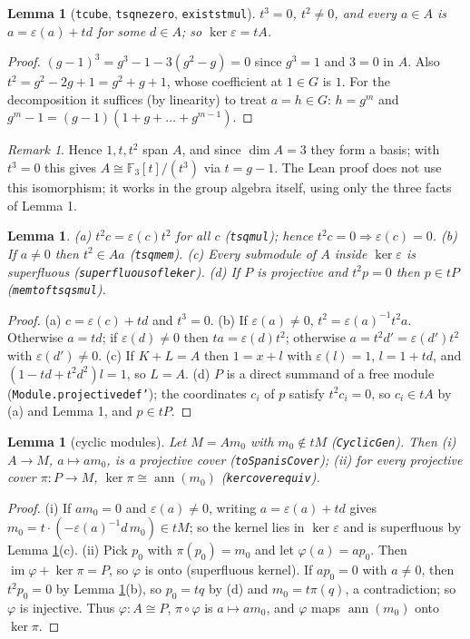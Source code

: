 \documentclass[11pt]{article}
\renewcommand{\_}{\oldus\allowbreak}
\newtheorem{lemma}[theorem]{Lemma}
\theoremstyle{definition}
\theoremstyle{remark}
\newtheorem{remark}[theorem]{Remark}
\begin{document}
\begin{lemma}[\texttt{t\_cube}, \texttt{t\_sq\_ne\_zero}, \texttt{exists\_t\_mul}]
$t^3=0$, $t^2\ne0$, and every $a\in A$ is $a=\varepsilon(a)+td$ for some $d\in A$; so
$\ker\varepsilon=tA$.
\end{lemma}
\begin{proof}
$(g-1)^3=g^3-1-3(g^2-g)=0$ since $g^3=1$ and $3=0$ in $A$. Also $t^2=g^2-2g+1=g^2+g+1$, whose
coefficient at $1\in G$ is $1$. For the decomposition it suffices (by linearity) to treat $a=h\in G$:
$h=g^m$ and $g^m-1=(g-1)(1+g+\dots+g^{m-1})$.
\end{proof}

\begin{remark}
Hence $1,t,t^2$ span $A$, and since $\dim A=3$ they form a basis; with $t^3=0$ this gives
$A\cong\mathbb{F}_3[t]/(t^3)$ via $t=g-1$. The Lean proof does not use this isomorphism; it works in
the group algebra itself, using only the three facts of Lemma 1.
\end{remark}

\begin{lemma}\label{lem:alg}
(a) $t^2c=\varepsilon(c)t^2$ for all $c$ (\texttt{t\_sq\_mul}); hence $t^2c=0\Rightarrow\varepsilon(c)=0$.
(b) If $a\ne0$ then $t^2\in Aa$ (\texttt{t\_sq\_mem}).
(c) Every submodule of $A$ inside $\ker\varepsilon$ is superfluous (\texttt{superfluous\_of\_le\_ker}).
(d) If $P$ is projective and $t^2p=0$ then $p\in tP$ (\texttt{mem\_t\_of\_t\_sq\_smul}).
\end{lemma}
\begin{proof}
(a) $c=\varepsilon(c)+td$ and $t^3=0$. (b) If $\varepsilon(a)\ne0$, $t^2=\varepsilon(a)^{-1}t^2a$.
Otherwise $a=td$; if $\varepsilon(d)\ne0$ then $ta=\varepsilon(d)t^2$; otherwise $a=t^2d'=\varepsilon(d')t^2$
with $\varepsilon(d')\ne0$. (c) If $K+L=A$ then $1=x+l$ with $\varepsilon(l)=1$, $l=1+td$, and
$(1-td+t^2d^2)l=1$, so $L=A$. (d) $P$ is a direct summand of a free module
(\texttt{Module.projective\_def'}); the coordinates $c_i$ of $p$ satisfy $t^2c_i=0$, so
$c_i\in tA$ by (a) and Lemma 1, and $p\in tP$.
\end{proof}

\begin{lemma}[cyclic modules]\label{lem:cyc}
Let $M=Am_0$ with $m_0\notin tM$ (\texttt{CyclicGen}). Then
(i) $A\to M$, $a\mapsto am_0$, is a projective cover (\texttt{toSpan\_isCover});
(ii) for \emph{every} projective cover $\pi:P\to M$, $\ker\pi\cong\operatorname{ann}(m_0)$
(\texttt{ker\_cover\_equiv}).
\end{lemma}
\begin{proof}
(i) If $am_0=0$ and $\varepsilon(a)\ne0$, writing $a=\varepsilon(a)+td$ gives
$m_0=t\cdot(-\varepsilon(a)^{-1}d\,m_0)\in tM$; so the kernel lies in $\ker\varepsilon$ and is
superfluous by Lemma \ref{lem:alg}(c). (ii) Pick $p_0$ with $\pi(p_0)=m_0$ and let
$\varphi(a)=ap_0$. Then $\operatorname{im}\varphi+\ker\pi=P$, so $\varphi$ is onto
(superfluous kernel). If $ap_0=0$ with $a\ne0$, then $t^2p_0=0$ by Lemma \ref{lem:alg}(b), so
$p_0=tq$ by (d) and $m_0=t\pi(q)$, a contradiction; so $\varphi$ is injective. Thus $\varphi:A\cong P$,
$\pi\circ\varphi$ is $a\mapsto am_0$, and $\varphi$ maps $\operatorname{ann}(m_0)$ onto $\ker\pi$.
\end{proof}
\end{document}
